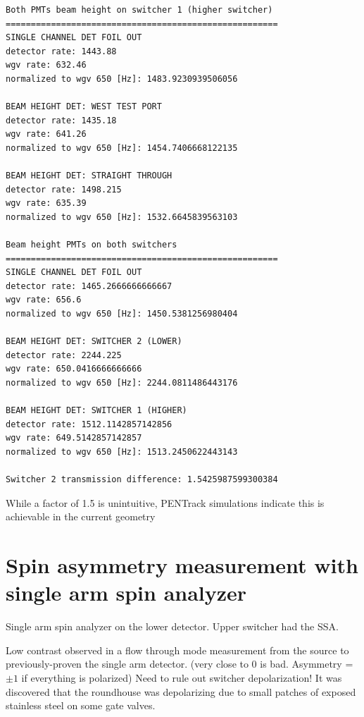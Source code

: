 \begin{small}
\begin{verbatim}
Both PMTs beam height on switcher 1 (higher switcher)
======================================================
SINGLE CHANNEL DET FOIL OUT
detector rate: 1443.88
wgv rate: 632.46
normalized to wgv 650 [Hz]: 1483.9230939506056

BEAM HEIGHT DET: WEST TEST PORT
detector rate: 1435.18
wgv rate: 641.26
normalized to wgv 650 [Hz]: 1454.7406668122135

BEAM HEIGHT DET: STRAIGHT THROUGH
detector rate: 1498.215
wgv rate: 635.39
normalized to wgv 650 [Hz]: 1532.6645839563103

Beam height PMTs on both switchers
======================================================
SINGLE CHANNEL DET FOIL OUT
detector rate: 1465.2666666666667
wgv rate: 656.6
normalized to wgv 650 [Hz]: 1450.5381256980404

BEAM HEIGHT DET: SWITCHER 2 (LOWER)
detector rate: 2244.225
wgv rate: 650.0416666666666
normalized to wgv 650 [Hz]: 2244.0811486443176

BEAM HEIGHT DET: SWITCHER 1 (HIGHER)
detector rate: 1512.1142857142856
wgv rate: 649.5142857142857
normalized to wgv 650 [Hz]: 1513.2450622443143

Switcher 2 transmission difference: 1.5425987599300384
\end{verbatim}
\end{small}

While a factor of 1.5 is unintuitive, PENTrack simulations indicate this is achievable in the current geometry


\section{Spin asymmetry measurement with single arm spin analyzer}\label{sec:single_arm_flow_through_west_2021}


Single arm spin analyzer on the lower detector. Upper switcher had the SSA. 

Low contrast observed in a flow through mode measurement from the source to previously-proven the single arm detector. (very close to 0 is bad. Asymmetry = $\pm 1$ if everything is polarized) Need to rule out switcher depolarization! It was discovered that the roundhouse was depolarizing due to small patches of exposed stainless steel on some gate valves. 

